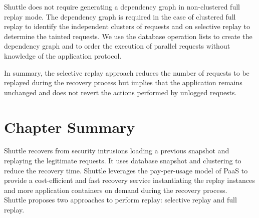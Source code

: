 



 Shuttle does not require generating a dependency graph in non-clustered full replay mode. The dependency graph is required in the case of clustered full replay to identify the independent clusters of requests and on selective replay to determine the tainted requests. We use the database operation lists to create the dependency graph and to order the execution of parallel requests without knowledge of the application protocol. 
 
 In summary, the selective replay approach reduces the number of requests to be replayed during the recovery process but implies that the application remains unchanged and does not revert the actions performed by unlogged requests. 


\section{Chapter Summary}
\label{sec:arch:summary}
Shuttle recovers from security intrusions loading a previous snapshot and replaying the legitimate requests. It uses database snapshot and clustering to reduce the recovery time. Shuttle leverages the pay-per-usage model of \ac{PaaS} to provide a cost-efficient and fast recovery service instantiating the replay instances and more application containers on demand during the recovery process. \\

Shuttle proposes two approaches to perform replay: selective replay and full replay. 

